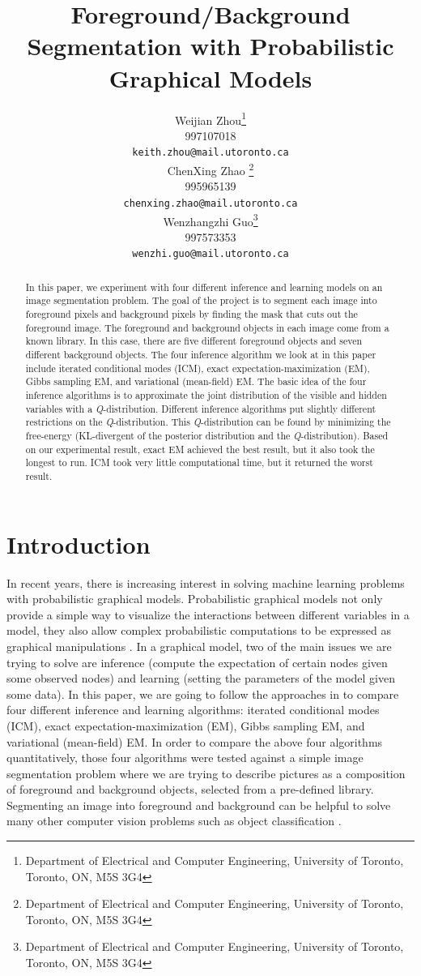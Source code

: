 \documentclass{article} %
\title{Foreground/Background Segmentation with Probabilistic Graphical Models}
\author{
Weijian Zhou\thanks{Department of Electrical and Computer Engineering, University of Toronto, Toronto, ON, M5S 3G4} \\
997107018 \\
\texttt{keith.zhou@mail.utoronto.ca} \\
\And
ChenXing Zhao \thanks{Department of Electrical and Computer Engineering, University of Toronto, Toronto, ON, M5S 3G4} \\
995965139\\
\texttt{chenxing.zhao@mail.utoronto.ca} \\
\AND
Wenzhangzhi Guo\thanks{Department of Electrical and Computer Engineering, University of Toronto, Toronto, ON, M5S 3G4} \\
997573353 \\
\texttt{wenzhi.guo@mail.utoronto.ca} \\
}
\begin{document}
\maketitle

\begin{abstract}
In this paper, we experiment with four different inference and learning models on an image segmentation problem. The goal of the project is to segment each image into foreground pixels and background pixels by finding the mask that cuts out the foreground image. The foreground and background objects in each image come from a known library. In this case, there are five different foreground objects and seven different background objects. The four inference algorithm we look at in this paper include iterated conditional modes (ICM), exact expectation-maximization (EM), Gibbs sampling EM, and variational (mean-field) EM. The basic idea of the four inference algorithms is to approximate the joint distribution of the visible and hidden variables with a \textit{Q}-distribution. Different inference algorithms put slightly different restrictions on the \textit{Q}-distribution. This \textit{Q}-distribution can be found by minimizing the free-energy (KL-divergent of the posterior distribution and the \textit{Q}-distribution). Based on our experimental result, exact EM achieved the best result, but it also took the longest to run. ICM took very little computational time, but it returned the worst result. 
\end{abstract}

\section{Introduction}
\label{intro}
In recent years, there is increasing interest in solving machine learning problems with probabilistic graphical models. Probabilistic graphical models not only provide a simple way to visualize the interactions between different variables in a model, they also allow complex probabilistic computations to be expressed as graphical manipulations \cite{b1}. In a graphical model, two of the main issues we are trying to solve are inference (compute the expectation of certain nodes given some observed nodes) and learning (setting the parameters of the model given some data). In this paper, we are going to follow the approaches in \cite{b2} to compare four different inference and learning algorithms: iterated conditional modes (ICM), exact expectation-maximization (EM), Gibbs sampling EM, and variational (mean-field) EM. In order to compare the above four algorithms quantitatively, those four algorithms were tested against a simple image segmentation problem where we are trying to describe pictures as a composition of foreground and background objects, selected from a pre-defined library. Segmenting an image into foreground and background can be helpful to solve many other computer vision problems such as object classification \cite{b2}.
\end{document}
